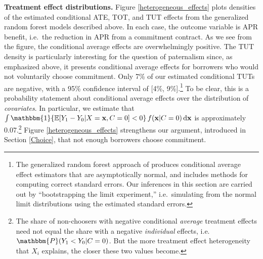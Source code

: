 \documentclass[ecta,nameyear,final]{econsocart}
\begin{document}
\noindent \textbf{Treatment effect distributions.} Figure \ref{heterogeneous_effects} plots densities of the estimated conditional ATE, TOT, and TUT effects from the generalized random forest models described above.
In each case, the outcome variable is APR benefit, i.e.\ the reduction in APR from a commitment contract.
As we see from the figure, the conditional average effects are overwhelmingly positive. 
The TUT density is particularly interesting for the question of paternalism since, as emphasized above, it presents conditional average effects for borrowers who would not voluntarily choose commitment.
Only 7\% of our estimated conditional TUTs are negative, with a 95\% confidence interval of [4\%, 9\%].\footnote{The generalized random forest approach of \cite{atheygrf} produces conditional average effect estimators that are asymptotically normal, and includes methods for computing correct standard errors. %
Our inferences in this section are carried out by ``bootstrapping the limit experiment,'' i.e.\ simulating from the normal limit distributions using the estimated standard errors.} 
To be clear, this is a probability statement about conditional average effects over the distribution of \emph{covariates}.
In particular, we estimate that  $\int \mathbbm{1}\{\mathbb{E}[Y_1 - Y_0| X = \mathbf{x}, C = 0] < 0\} \, f(\mathbf{x}|C=0) \, \mathrm{d}\mathbf{x}$ is approximately 0.07.\footnote{The share of non-choosers with negative conditional \emph{average} treatment effects need not equal the share with a negative \emph{individual} effects, i.e.\ $\mathbbm{P}(Y_1 < Y_0| C = 0)$.
But the more treatment effect heterogeneity that $X_i$ explains, the closer these two values become.}
Figure \ref{heterogeneous_effects} strengthens our argument, introduced in Section \ref{Choice}, that not enough borrowers choose commitment. 
\end{document}
